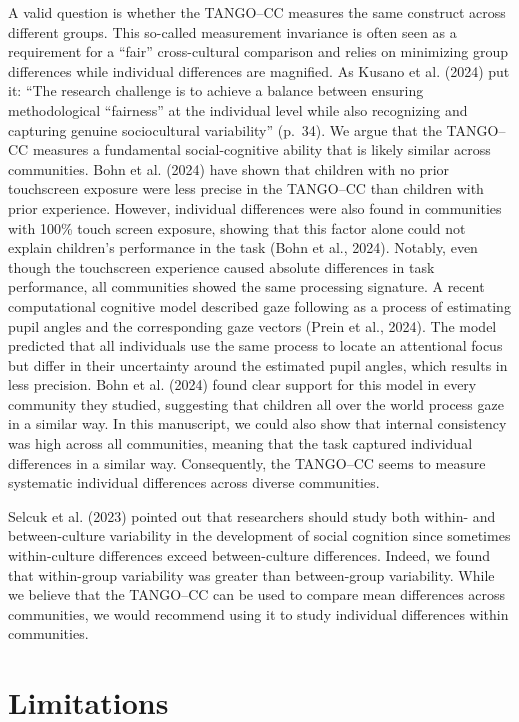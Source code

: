 \documentclass[
  man,floatsintext]{apa7}
\begin{document}
A valid question is whether the TANGO--CC measures the same construct across different groups.
This so-called measurement invariance is often seen as a requirement for a ``fair'' cross-cultural comparison and relies on minimizing group differences while individual differences are magnified.
As Kusano et al. (2024) put it: ``The research challenge is to achieve a balance between ensuring methodological ``fairness'' at the individual level while also recognizing and capturing genuine sociocultural variability'' (p.~34).
We argue that the TANGO--CC measures a fundamental social-cognitive ability that is likely similar across communities.
Bohn et al. (2024) have shown that children with no prior touchscreen exposure were less precise in the TANGO--CC than children with prior experience.
However, individual differences were also found in communities with 100\% touch screen exposure, showing that this factor alone could not explain children's performance in the task (Bohn et al., 2024).
Notably, even though the touchscreen experience caused absolute differences in task performance, all communities showed the same processing signature.
A recent computational cognitive model described gaze following as a process of estimating pupil angles and the corresponding gaze vectors (Prein et al., 2024).
The model predicted that all individuals use the same process to locate an attentional focus but differ in their uncertainty around the estimated pupil angles, which results in less precision.
Bohn et al. (2024) found clear support for this model in every community they studied, suggesting that children all over the world process gaze in a similar way.
In this manuscript, we could also show that internal consistency was high across all communities, meaning that the task captured individual differences in a similar way.
Consequently, the TANGO--CC seems to measure systematic individual differences across diverse communities.

Selcuk et al. (2023) pointed out that researchers should study both within- and between-culture variability in the development of social cognition since sometimes within-culture differences exceed between-culture differences.
Indeed, we found that within-group variability was greater than between-group variability.
While we believe that the TANGO--CC can be used to compare mean differences across communities, we would recommend using it to study individual differences within communities.

\section{Limitations}\label{limitations}
\end{document}
